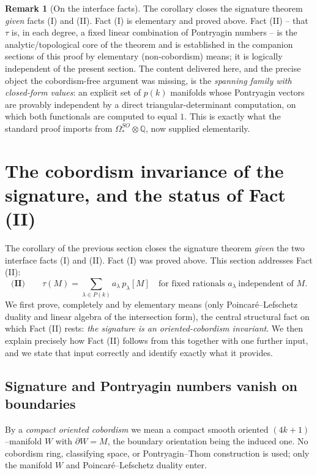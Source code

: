 \documentclass[12pt]{article}
\theoremstyle{definition}
\newtheorem{remark}{Remark}
\begin{document}
\bigskip

\begin{remark}[On the interface facts]
The corollary closes the signature theorem \emph{given} facts (I) and (II).  Fact (I) is
elementary and proved above.  Fact (II) -- that $\tau$ is, in each degree, a fixed linear
combination of Pontryagin numbers -- is the analytic/topological core of the theorem and
is established in the companion sections of this proof by elementary (non-cobordism)
means; it is logically independent of the present section.  The content delivered here,
and the precise object the cobordism-free argument was missing, is the
\emph{spanning family with closed-form values}: an explicit set of $p(k)$ manifolds whose
Pontryagin vectors are provably independent by a direct triangular-determinant
computation, on which both functionals are computed to equal $1$.  This is exactly what
the standard proof imports from $\Omega^{SO}_\ast\otimes\mathbb{Q}$, now supplied
elementarily.
\end{remark}

\bigskip

\section{The cobordism invariance of the signature, and the status of Fact
(II)}\label{sec:factII}

The corollary of the previous section closes the signature theorem \emph{given} the two
interface facts (I) and (II).  Fact (I) was proved above.  This section addresses Fact
(II):
\[
\textbf{(II)}\qquad
\tau(M)=\sum_{\lambda\in P(k)}a_\lambda\,p_\lambda[M]
\quad\text{for fixed rationals }a_\lambda\ \text{independent of }M .
\]
We first prove, completely and by elementary means (only Poincar\'e--Lefschetz duality
and linear algebra of the intersection form), the central structural fact on which Fact
(II) rests: \emph{the signature is an oriented-cobordism invariant}.  We then explain
precisely how Fact (II) follows from this together with one further input, and we state
that input correctly and identify exactly what it provides.

\subsection*{Signature and Pontryagin numbers vanish on boundaries}

By a \emph{compact oriented cobordism} we mean a compact smooth oriented
$(4k{+}1)$--manifold $W$ with $\partial W=M$, the boundary orientation being the induced
one.  No cobordism ring, classifying space, or Pontryagin--Thom construction is used; only
the manifold $W$ and Poincar\'e--Lefschetz duality enter.
\end{document}
